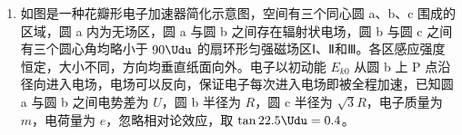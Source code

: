 \documentclass[\gkver]{gaokaozhenti}
\begin{document}
\begin{enumerate}
\begin{enumerate}
	\item
	通过计算，判断乙算珠能否滑动到边框 a；

	\item
	求甲算珠从拨出到停下所需的时间。
\end{enumerate}



\item
如图是一种花瓣形电子加速器简化示意图，空间有三个同心圆 a、b、c 围成的区域，圆 a 内为无场区，圆 a 与圆 b 之间存在辐射状电场，圆 b 与圆 c 之间有三个圆心角均略小于 $90\Udu$ 的扇环形匀强磁场区Ⅰ、Ⅱ和Ⅲ。各区感应强度恒定，大小不同，方向均垂直纸面向外。电子以初动能 $E_{k0}$ 从圆 b 上 P 点沿径向进入电场，电场可以反向，保证电子每次进入电场即被全程加速，已知圆 a 与圆 b 之间电势差为 $U$，圆 b 半径为 $R$，圆 c 半径为 $\sqrt{3}R$，电子质量为 $m$，电荷量为 $e$，忽略相对论效应，取 $\tan22.5\Udu=0.4$。


\end{enumerate}
\end{document}
